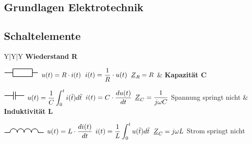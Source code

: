 \documentclass{article}
\begin{document}
\begin{twocolumn}

\section{Grundlagen Elektrotechnik}

\subsection{Schaltelemente}

\begin {tabularx}{\columnwidth}{Y|Y|Y}
\textbf{Wiederstand R} \newline 

\includegraphics[scale=1]{images/resistor.jpg} \newline
$\displaystyle u(t) = R \cdot i(t)$ \newline
$\displaystyle i(t) = \frac{1}{R} \cdot u(t)$ \newline
$\displaystyle \underline{Z}_R = R$ \newline
&
\textbf{Kapazität C} \newline

\includegraphics[scale=1]{images/condensator.jpg} \newline
$\displaystyle u(t) = \frac{1}{C} \int_0^t i(\tilde{t})d\tilde{t}$ \newline
$\displaystyle i(t) = C \cdot \frac{du(t)}{dt}$ \newline
$\displaystyle \underline{Z}_C = \frac{1}{j \omega C}$ \newline
Spannung springt nicht
&
\textbf{Induktivität L} \newline

\includegraphics[scale=1]{images/inductor.jpg} \newline
$\displaystyle u(t) = L \cdot \frac{di(t)}{dt}$ \newline
$\displaystyle i(t) = \frac{1}{L} \int_0^t u(\tilde{t})d\tilde{t}$ \newline
$\displaystyle \underline{Z}_C = j \omega L$ \newline
Strom springt nicht

\end{tabularx} 


\end{twocolumn}
\end{document}
